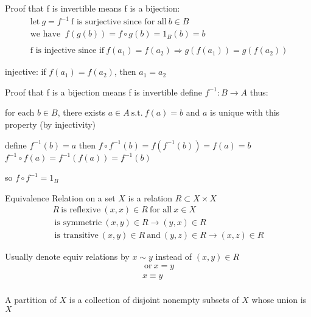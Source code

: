 \documentclass[class=scrartcl, crop=false]{standalone}
\begin{document}
Proof that f is invertible means f is a bijection: 
\begin{align*}
  \ \text{let} \ g = f^{-1}
  \ \text{f is surjective since for all} \ b \in B \\
  \ \text{we have } \ f(g(b)) = f\circ g (b) = 1_B(b) = b \\\\
  \ \text{f is injective since if} \ f(a_1) = f(a_2) \Rightarrow g(f(a_1)) = g(f(a_2))
\end{align*} 

injective: if $f(a_1) = f(a_2)$, then $a_1 = a_2$

Proof that f is a bijection means f is invertible
define $f^{-1}: B \to A$ thus:


for each $b \in B$, there exists $a \in A \ \text{s.t.} \ f(a) = b$ and $a$ is unique with this property (by injectivity)

define $f^{-1}(b) = a$ then $f\circ f^{-1} (b) = f(f^{-1}(b)) = f(a) = b$ 
$f^{-1}\circ f(a) = f^{-1}(f(a)) = f^{-1}(b)$

so $f\circ f^{-1} = 1_B$


\begin{definition}
 Equivalence Relation on a set $X$ is a relation $R \subset X \times X$
\begin{align*}
  R \ \text{is reflexive} \ (x, x) \in R \ \text{for all} \ x \in X \\
  \ \text{is symmetric} \ (x, y) \in R \to (y, x) \in R \\
  \ \text{is transitive} \ (x, y) \in R \ \text{and} \ (y, z) \in R \to (x, z) \in R
\end{align*} 
 
\end{definition}

\begin{note}
Usually denote equiv relations by $x \sim y$ instead of $(x, y) \in R$ 
\begin{align*}
\ \text{or} \ x = y \\
x \equiv y \\
\end{align*} 
 
\end{note}

\begin{definition}
  
A partition of $X$ is a collection of disjoint nonempty subsets of $X$ whose union is $X$
\end{definition}
\end{document}
